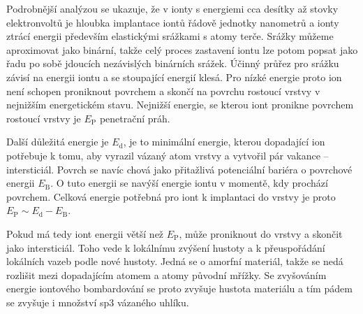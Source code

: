 Podrobnější analýzou se ukazuje, že v ionty s energiemi cca desítky až stovky elektronvoltů je hloubka implantace iontů řádově jednotky nanometrů a ionty ztrácí energii především elastickými srážkami s atomy terče. Srážky můžeme aproximovat jako binární, takže celý proces zastavení iontu lze potom popsat jako řadu po sobě jdoucích nezávislých binárních srážek. Účinný průřez pro srážku závisí na energii iontu a se stoupající energií klesá. Pro nízké energie proto ion není schopen proniknout povrchem a skončí na povrchu rostoucí vrstvy v nejnižším energetickém stavu. Nejnižší energie, se kterou iont pronikne povrchem rostoucí vrstvy je $E_\mathrm{P}$ penetrační práh. 

Další důležitá energie je $E_\mathrm{d}$, je to minimální energie, kterou dopadající ion potřebuje k tomu, aby vyrazil vázaný atom vrstvy a vytvořil pár vakance -- intersticiál. Povrch se navíc chová jako přitažlivá potenciální bariéra o povrchové energii $E_\mathrm{B}$. O tuto energii se navýší energie iontu v momentě, kdy prochází povrchem. Celková energie potřebná pro iont k implantaci do vrstvy je proto $E_\mathrm{P} \sim E_\mathrm{d} - E_\mathrm{B}$. 

Pokud má tedy iont energii větší než $E_\mathrm{P}$, může proniknout do vrstvy a skončit jako intersticiál. Toho vede k lokálnímu zvýšení hustoty a k přeuspořádání lokálních vazeb podle nové hustoty. Jedná se o amorfní materiál, takže se nedá rozlišit mezi dopadajícím atomem a atomy původní mřížky. Se zvyšováním energie iontového bombardování se proto zvyšuje hustota materiálu a tím pádem se zvyšuje i množství sp3 vázaného uhlíku.

